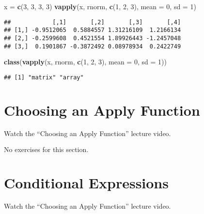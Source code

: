 \documentclass[
]{article}
\newenvironment{Shaded}{\begin{snugshade}}{\end{snugshade}}
\newcommand{\DataTypeTok}[1]{\textcolor[rgb]{0.13,0.29,0.53}{#1}}
\newcommand{\DecValTok}[1]{\textcolor[rgb]{0.00,0.00,0.81}{#1}}
\newcommand{\KeywordTok}[1]{\textcolor[rgb]{0.13,0.29,0.53}{\textbf{#1}}}
\newcommand{\NormalTok}[1]{#1}
\newcommand{\StringTok}[1]{\textcolor[rgb]{0.31,0.60,0.02}{#1}}
\begin{document}
\begin{Shaded}
\begin{Highlighting}[]
\NormalTok{x =}\StringTok{ }\KeywordTok{c}\NormalTok{(}\DecValTok{3}\NormalTok{, }\DecValTok{3}\NormalTok{, }\DecValTok{3}\NormalTok{, }\DecValTok{3}\NormalTok{)}
\KeywordTok{vapply}\NormalTok{(x, rnorm, }\KeywordTok{c}\NormalTok{(}\DecValTok{1}\NormalTok{, }\DecValTok{2}\NormalTok{, }\DecValTok{3}\NormalTok{), }\DataTypeTok{mean =} \DecValTok{0}\NormalTok{, }\DataTypeTok{sd =} \DecValTok{1}\NormalTok{)}
\end{Highlighting}
\end{Shaded}

\begin{verbatim}
##            [,1]       [,2]       [,3]       [,4]
## [1,] -0.9512065  0.5884557 1.31216109  1.2166134
## [2,] -0.2599608  0.4521554 1.89926443 -1.2457048
## [3,]  0.1901867 -0.3872492 0.08978934  0.2422749
\end{verbatim}

\begin{Shaded}
\begin{Highlighting}[]
\KeywordTok{class}\NormalTok{(}\KeywordTok{vapply}\NormalTok{(x, rnorm, }\KeywordTok{c}\NormalTok{(}\DecValTok{1}\NormalTok{, }\DecValTok{2}\NormalTok{, }\DecValTok{3}\NormalTok{), }\DataTypeTok{mean =} \DecValTok{0}\NormalTok{, }\DataTypeTok{sd =} \DecValTok{1}\NormalTok{))}
\end{Highlighting}
\end{Shaded}

\begin{verbatim}
## [1] "matrix" "array"
\end{verbatim}

\hypertarget{choosing-an-apply-function}{%
\section{Choosing an Apply Function}\label{choosing-an-apply-function}}

Watch the ``Choosing an Apply Function'' lecture video.

No exercises for this section.

\hypertarget{conditional-expressions}{%
\section{Conditional Expressions}\label{conditional-expressions}}

Watch the ``Choosing an Apply Function'' lecture video.
\end{document}
